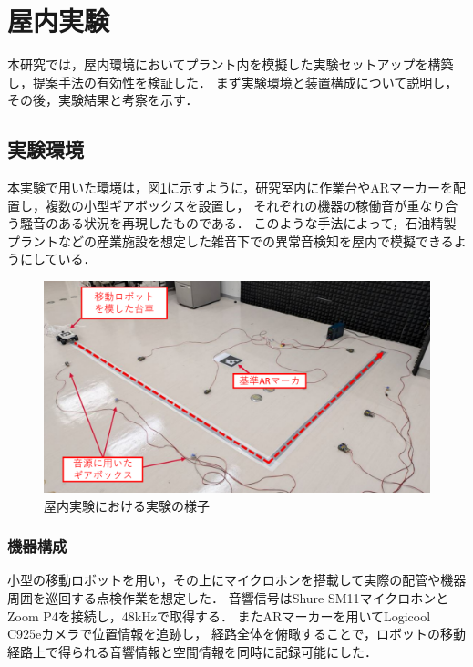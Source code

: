 \documentclass[../main]{subfiles}
\begin{document}
\section{屋内実験} \label{sec:indoor_experiment}

本研究では，屋内環境においてプラント内を模擬した実験セットアップを構築し，提案手法の有効性を検証した．
まず実験環境と装置構成について説明し，その後，実験結果と考察を示す．

\subsection{実験環境} \label{subsec:vexp_ref_environmet}

本実験で用いた環境は，図\ref{fig:exp_setup}に示すように，研究室内に作業台やARマーカーを配置し，複数の小型ギアボックスを設置し，
それぞれの機器の稼働音が重なり合う騒音のある状況を再現したものである．
このような手法によって，石油精製プラントなどの産業施設を想定した雑音下での異常音検知を屋内で模擬できるようにしている．
\begin{figure}[t]
  \centering
  \includegraphics[keepaspectratio, width=1.0\linewidth]{chap4/env_experiment.png}
  \caption{屋内実験における実験の様子}
  \label{fig:exp_setup}
\end{figure}


\subsubsection{機器構成} \label{subsubsec:device_config}

小型の移動ロボットを用い，その上にマイクロホンを搭載して実際の配管や機器周囲を巡回する点検作業を想定した．
音響信号はShure SM11マイクロホンとZoom P4を接続し，48kHzで取得する．
またARマーカーを用いてLogicool C925eカメラで位置情報を追跡し，
経路全体を俯瞰することで，ロボットの移動経路上で得られる音響情報と空間情報を同時に記録可能にした．
\end{document}
